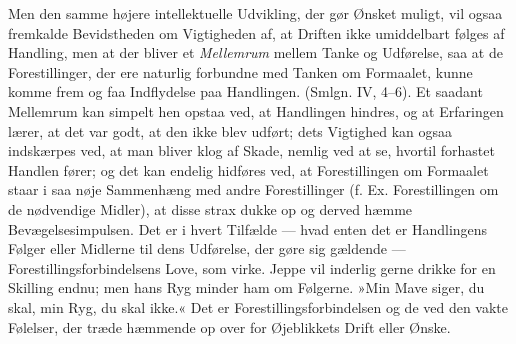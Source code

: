\documentclass[12pt,a4paper,openany]{book}
\newcommand{\opage}[1]{\marginnote{\footnotesize\textit{[#1]}}}
\begin{document}
\opage{382}Men den samme højere intellektuelle Udvikling, der gør Ønsket
muligt, vil ogsaa fremkalde Bevidstheden om Vigtigheden af, at Driften
ikke umiddelbart følges af Handling, men at der bliver et
\emph{Mellemrum} mellem Tanke og Udførelse, saa at de Forestillinger,
der ere naturlig forbundne med Tanken om Formaalet, kunne komme frem og
faa Indflydelse paa Handlingen. (Smlgn. IV, 4--6). Et saadant Mellemrum
kan simpelt hen opstaa ved, at Handlingen hindres, og at Erfaringen
lærer, at det var godt, at den ikke blev udført; dets Vigtighed kan
ogsaa indskærpes ved, at man bliver klog af Skade, nemlig ved at se,
hvortil forhastet Handlen fører; og det kan endelig hidføres ved, at
Forestillingen om Formaalet staar i saa nøje Sammenhæng med andre
Forestillinger (f. Ex. Forestillingen om de nødvendige Midler), at disse
strax dukke op og derved hæmme Bevægelsesimpulsen. Det er i hvert
Tilfælde --- hvad enten det er Handlingens Følger eller Midlerne til
dens Udførelse, der gøre sig gældende --- Forestillingsforbindelsens
Love, som virke. Jeppe vil inderlig gerne drikke for en Skilling endnu;
men hans Ryg minder ham om Følgerne. »Min Mave siger, du skal, min Ryg,
du skal ikke.« Det er Forestillingsforbindelsen og de ved den vakte
Følelser, der træde hæmmende op over for Øjeblikkets Drift eller Ønske.
\end{document}
